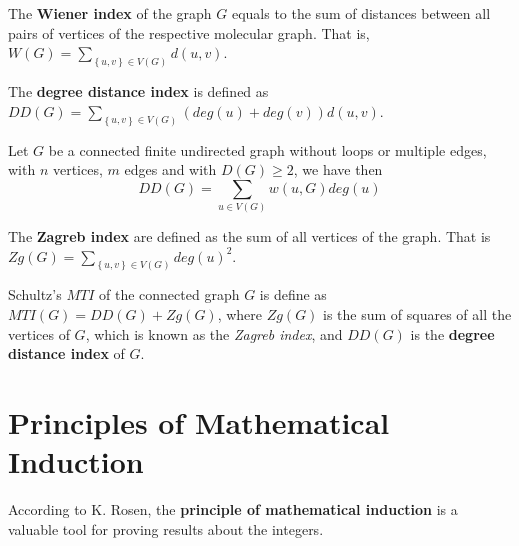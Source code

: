 \begin{defn}\rm 
\cite{wiener_trees_mg} The \textbf{Wiener index} of the graph $G$ equals to the sum of distances between all pairs of vertices of the respective molecular graph. That is, $W(G)=\sum_{\left\lbrace u,v \right\rbrace \in V(G)} d(u,v)$.
\label{sec:wiener}
\end{defn}


\begin{defn}\rm 
\cite{ddu} The \textbf{degree distance index} is defined as $DD(G)=\sum_{\left\lbrace u,v \right\rbrace \in V(G)} (deg(u)+deg(v))d(u,v)$.
\label{sec:dd(g)}
\end{defn}

\begin{thm}\rm
\cite{esalih} Let $G$ be a connected finite undirected graph without loops or multiple edges, with $n$ vertices, $m$ edges and with $D(G)\geq2$, we have then $$DD(G)=\sum_{u\in V(G)} w(u,G)deg(u)$$ 
\label{sec:dd_wiener}
\end{thm}

\begin{defn}\rm 
\cite{wien_schultz_mti} The \textbf{Zagreb index} are defined as the sum of all vertices of the graph. That is $Zg(G)=\sum_{\left\lbrace u,v \right\rbrace \in V(G)} deg(u)^2$.
\label{sec:m1(g)}
\end{defn}

\begin{defn}\rm
\cite{wien_schultz_mti} Schultz's $MTI$ of the connected graph $G$ is define as $MTI(G)=DD(G)+Zg(G)$, where $Zg(G)$ is the sum of squares of all the vertices of $G$, which is known as the \textit{Zagreb index}, and $DD(G)$ is the \textbf{degree distance index} of $G$. 
\label{sec:s_mti}
\end{defn}

\section{Principles of Mathematical Induction}
According to K. Rosen, the \textbf{principle of mathematical induction} is a valuable tool for proving results about the integers. \medskip

